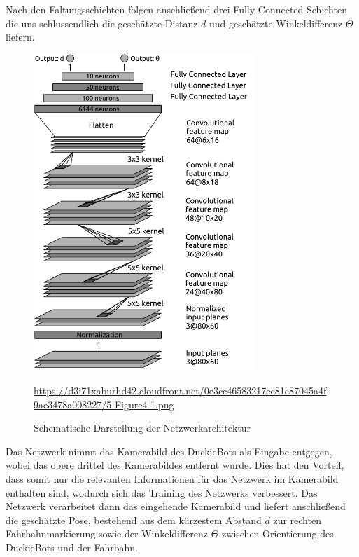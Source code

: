 Nach den Faltungsschichten folgen anschließend drei Fully-Connected-Schichten die uns schlussendlich die geschätzte Distanz $d$ und geschätzte Winkeldifferenz $\Theta$ liefern.
\vspace{0.6cm}
\begin{figure}[H]
	\centering
	\includegraphics[width=0.75\textwidth]{kapitel4/images/network_architecture.png}
	\caption{Schematische Darstellung der Netzwerkarchitektur}
	\label{network-architecture}
	\vspace{0.2cm}
	\quelle\url{https://d3i71xaburhd42.cloudfront.net/0e3cc46583217ec81e87045a4f9ae3478a008227/5-Figure4-1.png}
\end{figure}

Das Netzwerk nimmt das Kamerabild des DuckieBots als Eingabe entgegen, wobei das obere drittel des Kamerabildes entfernt wurde. Dies hat den Vorteil, dass somit nur die relevanten Informationen für das Netzwerk im Kamerabild enthalten sind, wodurch sich das Training des Netzwerks verbessert. Das Netzwerk verarbeitet dann das eingehende Kamerabild und liefert anschließend die geschätzte Pose, bestehend aus dem kürzestem Abstand $d$ zur rechten Fahrbahnmarkierung sowie der Winkeldifferenz $\Theta$ zwischen Orientierung des DuckieBots und der Fahrbahn.


